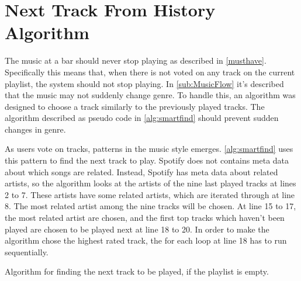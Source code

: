 \section{Next Track From History Algorithm}
\label{sec:algorithm}

The music at a bar should never stop playing as described in
\cref{musthave}. Specifically this means that, when there is not voted
on any track on the current playlist, the system should not stop
playing. In \cref{sub:MusicFlow} it's described that the music may not
suddenly change genre. To handle this, an algorithm was designed to
choose a track similarly to the previously played tracks. The
algorithm described as pseudo code in \cref{alg:smartfind} should
prevent sudden changes in genre.

As users vote on tracks, patterns in the music style
emerges. \cref{alg:smartfind} uses this pattern to find the next track
to play. Spotify does not contains meta data about which songs are
related. Instead, Spotify has meta data about related artists, so the
algorithm looks at the artists of the nine last played tracks at lines
2 to 7. These artists have some related artists, which are iterated
through at line 8. The most related artist among the nine tracks will
be chosen. At line 15 to 17, the most related artist are chosen, and
the first top tracks which haven't been played are chosen to be played
next at line 18 to 20. In order to make the algorithm chose the
highest rated track, the for each loop at line 18 has to run
sequentially.

\begin{algorithm}[hbtp]
\caption{Algorithm for finding the next track to be played, if the playlist is empty.}\label{alg:smartfind}
\begin{algorithmic}[1]
	 
		\EndIf{}
					\Else{}
					\EndIf{}
				\EndFor{}
			\EndFor{}
		\EndFor{}
			\EndIf{}
		\EndFor{}
			\State{}
			\EndIf{}
		\EndFor{}
	\EndFunction{}
\end{algorithmic}
\end{algorithm}
